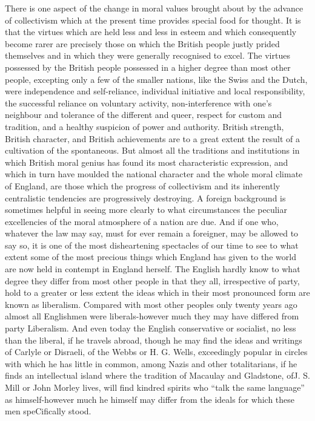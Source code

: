 \documentclass[11pt,openany]{book}
\begin{document}
There is one aspect of the change in moral values brought about by the advance of collectivism which at the present time provides special food for thought. It is that the virtues which are held less and less in esteem and which consequently become rarer are precisely those on which the British people justly prided themselves and in which they were generally recognised to excel. The virtues possessed by the British people possessed in a higher degree than most other people, excepting only a few of the smaller nations, like the Swiss and the Dutch, were independence and self-reliance, individual initiative and local responsibility, the successful reliance on voluntary activity, non-interference with one's neighbour and tolerance of the different and queer, respect for custom and tradition, and a healthy suspicion of power and authority. British strength, British character, and British achievements are to a great extent the result of a cultivation of the spontaneous. But almost all the traditions and institutions in which British moral genius has found its most characteristic expression, and which in turn have moulded the national character and the whole moral climate of England, are those which the progress of collectivism and its inherently centralistic tendencies are progressively destroying. A foreign background is sometimes helpful in seeing more clearly to what circumstances the peculiar excellencies of the moral atmosphere of a nation are due. And if one who, whatever the law may say, must for ever remain a foreigner, may be allowed to say so, it is one of the most disheartening spectacles of our time to see to what extent some of the most precious things which England has given to the world are now held in contempt in England herself. The English hardly know to what degree they differ from most other people in that they all, irrespective of party, hold to a greater or less extent the ideas which in their most pronounced form are known as liberalism. Compared with most other peoples only twenty years ago almost all Englishmen were liberals-however much they may have differed from party Liberalism. And even today the English conservative or socialist, no less than the liberal, if he travels abroad, though he may find the ideas and writings of Carlyle or Disraeli, of the Webbs or H. G. Wells, exceedingly popular in circles with which he has little in common, among Nazis and other totalitarians, if he finds an intellectual island where the tradition of Macaulay and Gladstone, ofJ. S. Mill or John Morley lives, will find kindred spirits who ``talk the same language'' as himself-however much he himself may differ from the ideals for which these men speCifically stood.
\end{document}
